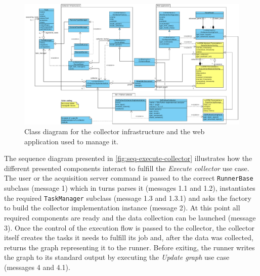 \begin{figure}[p] 
  \centering
  \includegraphics[height=0.93\linewidth,angle=90,origin=c]{images/diagrams/class-collector}
  \caption[Class diagram for the data collection infrastructure.]{Class diagram for the collector infrastructure and the web application used to manage it.}
  \label{fig:class-collector}
\end{figure}

The sequence diagram presented in \vref{fig:seq-execute-collector} illustrates how the different presented components interact to fulfill the \emph{Execute collector} use case. The user or the acquisition server command is passed to the correct \texttt{Runner\BreakableSlash{}Base} subclass (message 1) which in turns parses it (messages 1.1 and 1.2), instantiates the required \texttt{TaskManager} subclass (message 1.3 and 1.3.1) and asks the factory to build the collector implementation instance (message 2). At this point all required components are ready and the data collection can be launched (message 3). Once the control of the execution flow is passed to the collector, the collector itself creates the tasks it needs to fulfill its job and, after the data was collected, returns the graph representing it to the runner. Before exiting, the runner writes the graph to its standard output by executing the \emph{Update graph} use case (messages 4 and 4.1).

